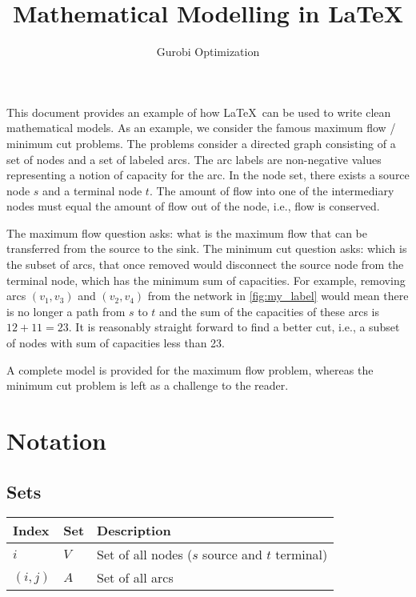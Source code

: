 \documentclass{article}
\title{Mathematical Modelling in \LaTeX}
\author{Gurobi Optimization}
\begin{document}
\maketitle

This document provides an example of how \LaTeX\ can be used to write clean mathematical models. As an example, we consider the famous maximum flow / minimum cut problems. The problems consider a directed graph consisting of a set of nodes and a set of labeled arcs. The arc labels are non-negative values representing a notion of capacity for the arc. In the node set, there exists a source node $s$ and a terminal node $t$. The amount of flow into one of the intermediary nodes must equal the amount of flow out of the node, i.e., flow is conserved. 

The maximum flow question asks: what is the maximum flow that can be transferred from the source to the sink. The minimum cut question asks: which is the subset of arcs, that once removed would disconnect the source node from the terminal node, which has the minimum sum of capacities. For example, removing arcs $(v_1, v_3)$ and $(v_2, v_4)$ from the network in \ref{fig:my_label} would mean there is no longer a path from $s$ to $t$ and the sum of the capacities of these arcs is $12 + 11 = 23$. It is reasonably straight forward to find a better cut, i.e., a subset of nodes with sum of capacities less than 23.



A complete model is provided for the maximum flow problem, whereas the minimum cut problem is left as a challenge to the reader.

\section*{Notation}

\subsection*{Sets}

\begin{table}[H]
\centering
\begin{tabular}{p{1cm} p{1.5cm} p{9cm}}
\hline
\textbf{Index} & \textbf{Set} & \textbf{Description}\\
\hline
$i$ & $V$ & Set of all nodes ($s$ source and $t$ terminal)\\
$(i, j)$ & $A$ & Set of all arcs\\
\hline
\end{tabular}
\end{table}
\end{document}

